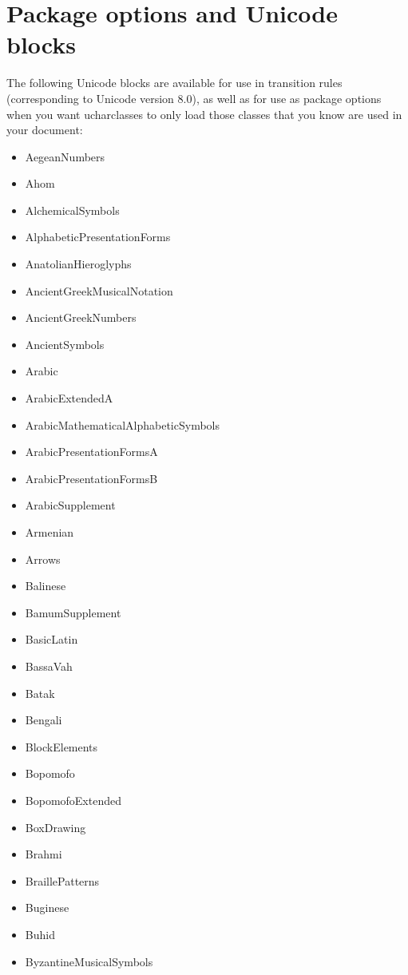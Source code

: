 ﻿\documentclass{article}
\newenvironment{itemlist}{%
  \begin{itemize}
	\setlength{\itemsep}{0pt}
	\setlength{\parsep}{0pt}
	\setlength{\topsep}{0pt}
	\setlength{\partopsep}{0pt}
	\setlength{\parskip}{0pt}
	\setlength{\labelsep}{5pt}}%
{
  \end{itemize}}
\begin{document}
	\section{Package options and Unicode blocks}
	
		The following Unicode blocks are available for use in transition rules (corresponding to Unicode version 8.0), as well as for use as package options when you want ucharclasses to only load those classes that you know are used in your document:
		
		\begin{multicols}{2}
			\begin{itemlist}
				\item AegeanNumbers
				\item Ahom
				\item AlchemicalSymbols
				\item AlphabeticPresentationForms
				\item AnatolianHieroglyphs
				\item AncientGreekMusicalNotation
				\item AncientGreekNumbers
				\item AncientSymbols
				\item Arabic
				\item ArabicExtendedA
				\item ArabicMathematicalAlphabeticSymbols
				\item ArabicPresentationFormsA
				\item ArabicPresentationFormsB
				\item ArabicSupplement
				\item Armenian
				\item Arrows
				\item Balinese
				\item BamumSupplement
				\item BasicLatin
				\item BassaVah
				\item Batak
				\item Bengali
				\item BlockElements
				\item Bopomofo
				\item BopomofoExtended
				\item BoxDrawing
				\item Brahmi
				\item BraillePatterns
				\item Buginese
				\item Buhid
				\item ByzantineMusicalSymbols

\end{itemlist}
\end{multicols}
\end{document}
